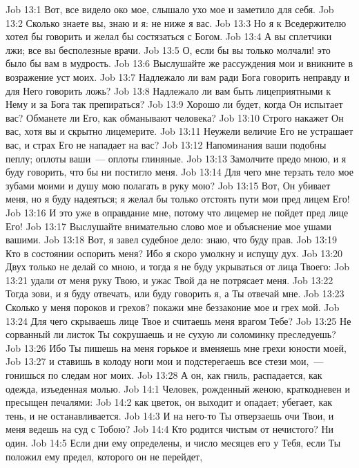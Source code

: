 \vs Job 13:1 Вот, все  видело око мое, слышало ухо мое и заметило для себя.
\vs Job 13:2 Сколько знаете вы, знаю и я: не ниже я вас.
\vs Job 13:3 Но я к Вседержителю хотел бы говорить и желал бы состязаться с Богом.
\vs Job 13:4 А вы сплетчики лжи; все вы бесполезные врачи.
\vs Job 13:5 О, если бы вы только молчали! это было бы  вам в мудрость.
\vs Job 13:6 Выслушайте же рассуждения мои и вникните в возражение уст моих.
\vs Job 13:7 Надлежало ли вам ради Бога говорить неправду и для Него говорить ложь?
\vs Job 13:8 Надлежало ли вам быть лицеприятными к Нему и за Бога так препираться?
\vs Job 13:9 Хорошо ли будет, когда Он испытает вас? Обманете ли Его, как обманывают человека?
\vs Job 13:10 Строго накажет Он вас, хотя вы и скрытно лицемерите.
\vs Job 13:11 Неужели величие Его не устрашает вас, и страх Его не нападает на вас?
\vs Job 13:12 Напоминания ваши подобны пеплу; оплоты ваши~--- оплоты глиняные.
\vs Job 13:13 Замолчите предо мною, и я буду говорить, что бы ни постигло меня.
\vs Job 13:14 Для чего мне терзать тело мое зубами моими и душу мою полагать в руку мою?
\vs Job 13:15 Вот, Он убивает меня, но я буду надеяться; я желал бы только отстоять пути мои пред лицем Его!
\vs Job 13:16 И это уже в оправдание мне, потому что лицемер не пойдет пред лице Его!
\vs Job 13:17 Выслушайте внимательно слово мое и объяснение мое ушами вашими.
\vs Job 13:18 Вот, я завел судебное дело: знаю, что буду прав.
\vs Job 13:19 Кто в состоянии оспорить меня? Ибо я скоро умолкну и испущу дух.
\vs Job 13:20 Двух только  не делай со мною, и тогда я не буду укрываться от лица Твоего:
\vs Job 13:21 удали от меня руку Твою, и ужас Твой да не потрясает меня.
\vs Job 13:22 Тогда зови, и я буду отвечать, или буду говорить я, а Ты отвечай мне.
\vs Job 13:23 Сколько у меня пороков и грехов? покажи мне беззаконие мое и грех мой.
\vs Job 13:24 Для чего скрываешь лице Твое и считаешь меня врагом Тебе?
\vs Job 13:25 Не сорванный ли листок Ты сокрушаешь и не сухую ли соломинку преследуешь?
\vs Job 13:26 Ибо Ты пишешь на меня горькое и вменяешь мне грехи юности моей,
\vs Job 13:27 и ставишь в колоду ноги мои и подстерегаешь все стези мои,~--- гонишься по следам ног моих.
\vs Job 13:28 А он, как гниль, распадается, как одежда, изъеденная молью.
\vs Job 14:1 Человек, рожденный женою, краткодневен и пресыщен печалями:
\vs Job 14:2 как цветок, он выходит и опадает; убегает, как тень, и не останавливается.
\vs Job 14:3 И на него-то Ты отверзаешь очи Твои, и меня ведешь на суд с Тобою?
\vs Job 14:4 Кто родится чистым от нечистого? Ни один.
\vs Job 14:5 Если дни ему определены, и число месяцев его у Тебя, если Ты положил ему предел, которого он не перейдет,
